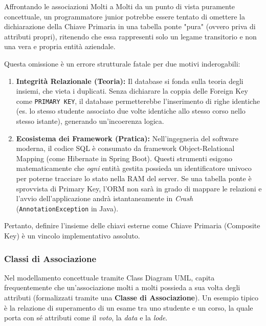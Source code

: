 \begin{warningbox}
Affrontando le associazioni Molti a Molti da un punto di vista puramente concettuale, un programmatore junior potrebbe essere tentato di omettere la dichiarazione della Chiave Primaria in una tabella ponte "pura" (ovvero priva di attributi propri), ritenendo che essa rappresenti solo un legame transitorio e non una vera e propria entità aziendale.

Questa omissione è un errore strutturale fatale per due motivi inderogabili:
\begin{enumerate}
    \item \textbf{Integrità Relazionale (Teoria):} Il database si fonda sulla teoria degli insiemi, che vieta i duplicati. Senza dichiarare la coppia delle Foreign Key come \texttt{PRIMARY KEY}, il database permetterebbe l'inserimento di righe identiche (es. lo stesso studente associato due volte identiche allo stesso corso nello stesso istante), generando un'incoerenza logica.
    \item \textbf{Ecosistema dei Framework (Pratica):} Nell'ingegneria del software moderna, il codice SQL è consumato da framework Object-Relational Mapping (come Hibernate in Spring Boot). Questi strumenti esigono matematicamente che \textit{ogni} entità gestita possieda un identificatore univoco per poterne tracciare lo stato nella RAM del server. Se una tabella ponte è sprovvista di Primary Key, l'ORM non sarà in grado di mappare le relazioni e l'avvio dell'applicazione andrà istantaneamente in \textit{Crash} (\texttt{AnnotationException} in Java).
\end{enumerate}
Pertanto, definire l'insieme delle chiavi esterne come Chiave Primaria (Composite Key) è un vincolo implementativo assoluto.
\end{warningbox}

\subsubsection*{Classi di Associazione}

Nel modellamento concettuale tramite Class Diagram UML, capita frequentemente che un'associazione molti a molti possieda a sua volta degli attributi (formalizzati tramite una \textbf{Classe di Associazione}). Un esempio tipico è la relazione di superamento di un esame tra uno studente e un corso, la quale porta con sé attributi come il \textit{voto}, la \textit{data} e la \textit{lode}.


